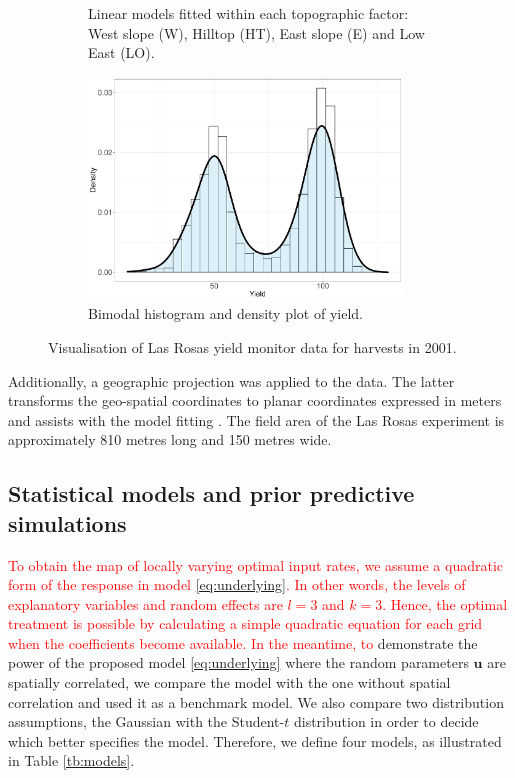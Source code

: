 \documentclass[a4paper]{article}   	%
\begin{document}
\begin{figure}[!htp]
\begin{subfigure}[t]{0.45\textwidth}
			\caption{Linear models fitted within each topographic factor: West slope (W), Hilltop (HT), East slope (E) and Low East (LO).}\label{fig:lasrossascatter}
		\end{subfigure}
		\space
		\begin{subfigure}[t]{0.45\textwidth}
			\centering
			\includegraphics[height=5.9cm,width=\linewidth]{Images/lasrossa_view04}
			\caption{Bimodal histogram and density plot of yield.}\label{fig:lasrossahist}
		\end{subfigure}
		\caption{Visualisation of Las Rosas yield monitor data for harvests in 2001.}\label{fig:lasrossa}
	\end{figure}
	
	
	Additionally, a geographic projection was applied to the data. The latter transforms the geo-spatial coordinates to planar coordinates expressed in meters and assists with the model fitting \parencite{Rakshit2020Novel}. The field area of the Las Rosas experiment is approximately 810 metres long and 150 metres wide.
	
	
	
	\subsection{Statistical models and prior predictive simulations}
	
	\textcolor{red}{To obtain the map of locally varying optimal input rates, we assume a quadratic form of the response in model \eqref{eq:underlying}. In other words, the levels of explanatory variables and random effects are $l=3$ and $k=3$. Hence, the optimal treatment is possible by calculating a simple quadratic equation for each grid when the coefficients become available. In the meantime, to} demonstrate the power of the proposed model \eqref{eq:underlying} where the random parameters $\bm{u}$ are spatially correlated, we compare the model with the one without spatial correlation and used it as a benchmark model. We also compare two distribution assumptions, the Gaussian  with the Student-$t$ distribution in order to decide which better specifies the model. Therefore, we define four models, as illustrated in Table \ref{tb:models}. 
	
\end{document}
